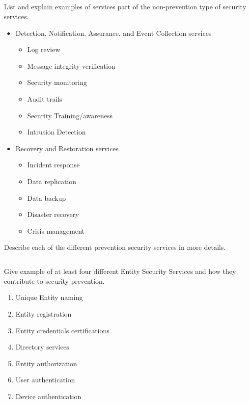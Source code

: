 \begin{questions}
\begin{parts}
  \part{} List and explain examples of services part of the non-prevention type of security services.
    \begin{solution}
      \begin{itemize}[noitemsep]
      \item Detection, Notification, Assurance, and Event Collection services
        \begin{itemize}[noitemsep]
        \item Log review
        \item Message integrity verification
        \item Security monitoring
        \item Audit trails
        \item Security Training/awareness
        \item Intrusion Detection
        \end{itemize}
      \item Recovery and Restoration services
        \begin{itemize}[noitemsep]
        \item Incident response
        \item Data replication
        \item Data backup
        \item Disaster recovery
        \item Crisis management
        \end{itemize}
      \end{itemize}
    \end{solution}
  \end{parts}

\question{} Describe each of the different prevention security services in more details.
  \begin{parts}
  \part{} Give example of at least four different Entity Security Services and how they contribute to security prevention.
    \begin{solution}
      \begin{enumerate}[noitemsep]
      \item Unique Entity naming
      \item Entity registration
      \item Entity credentials certifications
      \item Directory services
      \item Entity authorization
      \item User authentication
      \item Device authentication
      \end{enumerate}
    \end{solution}


\end{parts}
\end{questions}
